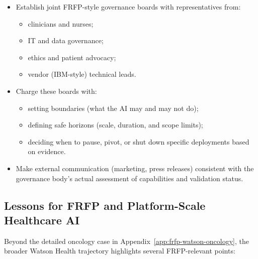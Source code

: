\begin{itemize}
  \item Establish joint FRFP-style governance boards with representatives
        from:
        \begin{itemize}
          \item clinicians and nurses;
          \item IT and data governance;
          \item ethics and patient advocacy;
          \item vendor (IBM-style) technical leads.
        \end{itemize}
  \item Charge these boards with:
        \begin{itemize}
          \item setting boundaries (what the AI may and may not do);
          \item defining safe horizons (scale, duration, and scope limits);
          \item deciding when to pause, pivot, or shut down specific
                deployments based on evidence.
        \end{itemize}
  \item Make external communication (marketing, press releases) consistent
        with the governance body’s actual assessment of capabilities and
        validation status.
\end{itemize}

\subsection{Lessons for FRFP and Platform-Scale Healthcare AI}

Beyond the detailed oncology case in Appendix~\ref{app:frfp-watson-oncology},
the broader Watson Health trajectory highlights several FRFP-relevant points:


